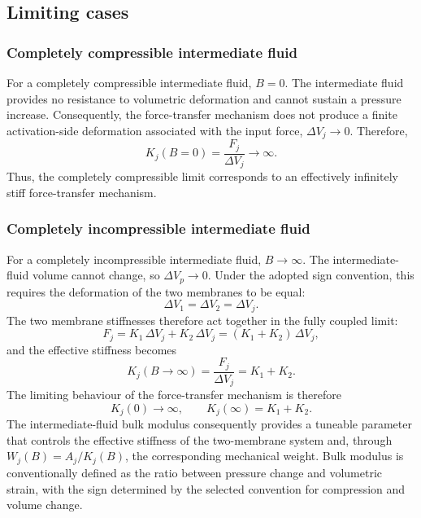 \documentclass[11pt,a4paper]{article}
\numberwithin{equation}{section}
\begin{document}
\begin{appendices}
\subsection{Limiting cases}

\subsubsection{Completely compressible intermediate fluid}
For a completely compressible intermediate fluid, $B = 0$. The intermediate fluid provides no resistance to
volumetric deformation and cannot sustain a pressure increase. Consequently, the force-transfer mechanism does not
produce a finite activation-side deformation associated with the input force, $\Delta V_j \rightarrow 0$. Therefore,
\begin{equation}
  K_j(B = 0) = \frac{F_j}{\Delta V_j} \rightarrow \infty .
\end{equation}
Thus, the completely compressible limit corresponds to an effectively infinitely stiff force-transfer mechanism.

\subsubsection{Completely incompressible intermediate fluid}
For a completely incompressible intermediate fluid, $B \rightarrow \infty$. The intermediate-fluid volume cannot
change, so $\Delta V_p \rightarrow 0$. Under the adopted sign convention, this requires the deformation of the two
membranes to be equal:
\begin{equation}
  \Delta V_1 = \Delta V_2 = \Delta V_j .
\end{equation}
The two membrane stiffnesses therefore act together in the fully coupled limit:
\begin{equation}
  F_j = K_1\,\Delta V_j + K_2\,\Delta V_j = (K_1 + K_2)\,\Delta V_j,
\end{equation}
and the effective stiffness becomes
\begin{equation}
  K_j(B \rightarrow \infty) = \frac{F_j}{\Delta V_j} = K_1 + K_2 .
\end{equation}
The limiting behaviour of the force-transfer mechanism is therefore
\begin{equation}
  K_j(0) \rightarrow \infty, \qquad K_j(\infty) = K_1 + K_2 .
\end{equation}
The intermediate-fluid bulk modulus consequently provides a tuneable parameter that controls the effective
stiffness of the two-membrane system and, through $W_j(B) = A_j/K_j(B)$, the corresponding mechanical weight. Bulk
modulus is conventionally defined as the ratio between pressure change and volumetric strain, with the sign
determined by the selected convention for compression and volume change.


\end{appendices}
\end{document}
